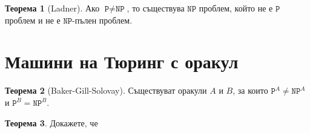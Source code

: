 \documentclass[a4paper]{article}
\theoremstyle{definition}
\newtheorem{theorem}{Теорема}
\begin{document}
\begin{theorem}[Ladner]
  Ако $\texttt{P} \neq \texttt{NP}$, то съществува $\texttt{NP}$ проблем, който не е $\texttt{P}$ проблем и не е $\texttt{NP}$-пълен проблем.
\end{theorem}

\section{Машини на Тюринг с оракул}

\begin{theorem}[Baker-Gill-Solovay]
  Съществуват оракули $A$ и $B$, за които $\texttt{P}^A \neq \texttt{NP}^A$ и $\texttt{P}^B = \texttt{NP}^B$.
\end{theorem}

\begin{theorem}
  Докажете, че 
\end{theorem}





\end{document}
